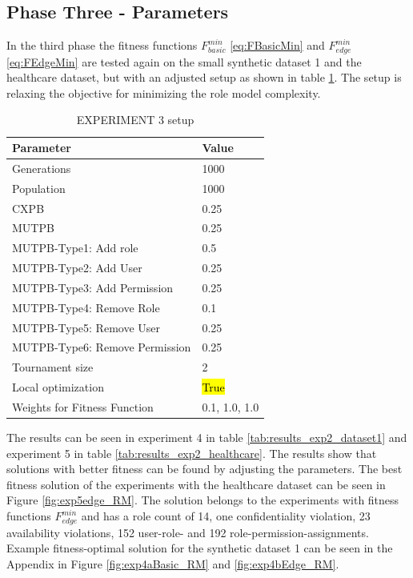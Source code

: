 \newpage
\subsection{Phase Three - Parameters}
\label{sec:phase3}
In the third phase the fitness functions $F_{basic}^{min}$ \eqref{eq:FBasicMin} and $F_{edge}^{min}$ \eqref{eq:FEdgeMin} are tested again on the small synthetic dataset 1 and the healthcare dataset, but with an adjusted setup as shown in table \ref{tab:setup3}. The setup is relaxing the objective for minimizing the role model complexity.\\
\begin{table}[H]
    \centering
    \begin{tabular}{|l|l|}
        \hline
        \rowcolor{myGray} 
        \textbf{Parameter}              & \textbf{Value}    \\ \hline
        Generations                     & 1000              \\ \hline
        Population                      & 1000              \\ \hline
        CXPB                            & 0.25              \\ \hline
        MUTPB                           & 0.25              \\ \hline
        MUTPB-Type1: Add role           & 0.5               \\ \hline
        MUTPB-Type2: Add User           & 0.25              \\ \hline
        MUTPB-Type3: Add Permission     & 0.25              \\ \hline
        MUTPB-Type4: Remove Role        & 0.1               \\ \hline
        MUTPB-Type5: Remove User        & 0.25              \\ \hline
        MUTPB-Type6: Remove Permission  & 0.25              \\ \hline
        Tournament size                 & 2                 \\ \hline
        Local optimization              & \hl{True}         \\ \hline
        Weights for Fitness Function    & 0.1, 1.0, 1.0     \\ \hline
    \end{tabular}
    \caption{EXPERIMENT 3 setup}
    \label{tab:setup3}
\end{table}

The results can be seen in experiment 4 in table \ref{tab:results_exp2_dataset1} and experiment 5 in table \ref{tab:results_exp2_healthcare}. The results show that solutions with better fitness can be found by adjusting the parameters. The best fitness solution of the experiments with the healthcare dataset can be seen in Figure \ref{fig:exp5edge_RM}. The solution belongs to the experiments with fitness functions $F_{edge}^{min}$ and has a role count of 14, one confidentiality violation, 23 availability violations, 152 user-role- and 192 role-permission-assignments. Example fitness-optimal solution for the synthetic dataset 1 can be seen in the Appendix in Figure \ref{fig:exp4aBasic_RM} and \ref{fig:exp4bEdge_RM}.


